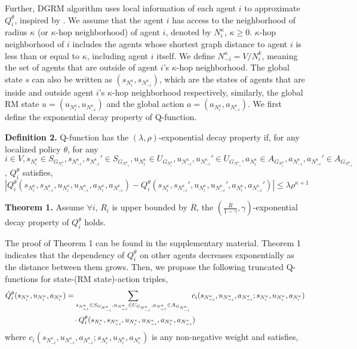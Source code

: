 \documentclass[conf]{new-aiaa}
\def\foo ABC{DGRM}
\begin{document}
Further, \foo ABC algorithm uses local information of each agent $i$ to approximate $Q_i^\theta$, inspired by \cite{qu2020scalable}. We assume that the agent $i$ has access to the neighborhood of radius $\kappa$ (or $\kappa$-hop neighborhood) of agent $i$, denoted by $N_i^{\kappa}$, $\kappa \ge 0$. $\kappa$-hop neighborhood of $i$ includes the agents whose shortest graph distance to agent $i$ is less than or equal to $\kappa$, including agent $i$ itself. We define $N_{-i}^\kappa=V/N_i^k$, meaning the set of agents that are outside of agent $i$'s $\kappa$-hop neighborhood. The global state $s$ can also be written as $(s_{N_i^\kappa}, s_{N_{-i}^\kappa})$, which are the states of agents that are inside and outside agent $i$'s $\kappa$-hop neighborhood respectively, similarly, the global RM state $u = (u_{N_i^\kappa}, u_{N_{-i}^\kappa})$ and the global action $a=(a_{N_i^\kappa}, a_{N_{-i}^\kappa})$. We first define the exponential decay property of Q-function.

\textbf{Definition 2.} Q-function has the $(\lambda, \rho)$-exponential decay property if, for any localized policy $\theta$, for any $i \in V, s_{N_i^\kappa} \in S_{G_{N_i^\kappa}}, s_{N_{-i}^\kappa}, s_{N_{-i}^\kappa}' \in S_{G_{N_{-i}^\kappa}}, u_{N_i^\kappa} \in U_{G_{N_i^\kappa}}, u_{N_{-i}^\kappa}, u_{N_{-i}^\kappa}' \in U_{G_{N_{-i}^\kappa}}, a_{N_i^\kappa} \in A_{G_{N_i^\kappa}}, a_{N_{-i}^\kappa}, a_{N_{-i}^\kappa}' \in A_{G_{N_{-i}^\kappa}}$, $Q_i^\theta$ satisfies,
\begin{equation}
    |Q_i^\theta(s_{N_i^\kappa}, s_{N_{-i}^\kappa}, u_{N_i^\kappa}, u_{N_{-i}^\kappa}, a_{N_i^\kappa}, a_{N_{-i}^\kappa})   - Q_i^\theta(s_{N_i^\kappa}, s_{N_{-i}^\kappa}', u_{N_i^\kappa}, u_{N_{-i}^\kappa}', a_{N_i^\kappa}, a_{N_{-i}^\kappa}')| \le \lambda \rho^{\kappa + 1}
\label{eq:decay0}
\end{equation}

\textbf{Theorem 1.} Assume $\forall i$, $R_i$ is upper bounded by $\overline{R}$, the $(\frac{\overline{R}}{1-\gamma}, \gamma)$-exponential decay property of $Q_i^\theta$ holds. 

The proof of Theorem 1 can be found in the supplementary material. Theorem 1 indicates that the dependency of $Q_i^\theta$ on other agents decreases exponentially as the distance between them grows. Then, we propose the following truncated Q-functions for state-(RM state)-action triples,
\begin{equation}
\begin{aligned}
    \Tilde{Q}_i^\theta(s_{N_i^\kappa}, u_{N_i^\kappa}, a_{N_i^\kappa}) &= \sum_{s_{N_{-i}^\kappa} \in S_{G_{N_{-i}^\kappa}}, u_{N_{-i}^\kappa} \in U_{G_{N_{-i}^\kappa}}, a_{N_{-i}^\kappa} \in A_{G_{N_{-i}^\kappa}}}  c_i(s_{N_{-i}^\kappa},u_{N_{-i}^\kappa},a_{N_{-i}^\kappa}; s_{N_i^\kappa},u_{N_i^\kappa},a_{N_i^\kappa}) \\ 
    & \quad \cdot Q_i^\theta(s_{N_i^\kappa},s_{N_{-i}^\kappa},u_{N_i^\kappa},u_{N_{-i}^\kappa},a_{N_i^\kappa},a_{N_{-i}^\kappa})
\end{aligned}
\label{eq:truncated_Q}
\end{equation}
where $c_i(s_{N_{-i}^\kappa},u_{N_{-i}^\kappa},a_{N_{-i}^\kappa}; s_{N_i^\kappa},u_{N_i^\kappa},a_{N_i^\kappa})$ is any non-negative weight and satisfies,
\end{document}
